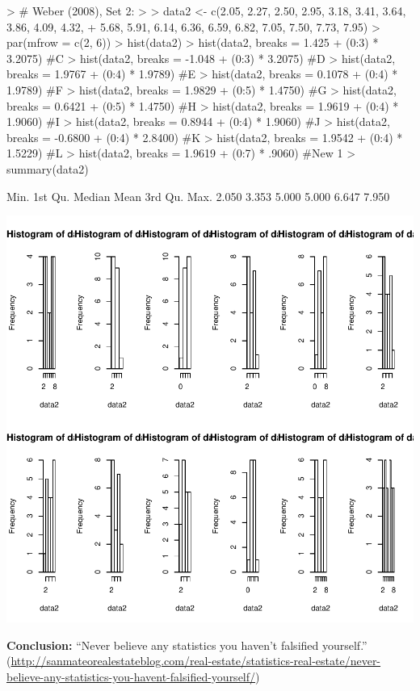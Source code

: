 \documentclass[12pt,letterpaper,final]{article}
\begin{document}
\begin{Schunk}
\begin{Sinput}
> # Weber (2008), Set 2:
> 
> data2 <- c(2.05, 2.27, 2.50, 2.95, 3.18, 3.41, 3.64, 3.86, 4.09, 4.32,
+   5.68, 5.91, 6.14, 6.36, 6.59, 6.82, 7.05, 7.50, 7.73, 7.95)
> par(mfrow = c(2, 6))
> hist(data2)
> hist(data2, breaks = 1.425 + (0:3) * 3.2075) #C
> hist(data2, breaks = -1.048 + (0:3) * 3.2075) #D
> hist(data2, breaks = 1.9767 + (0:4) * 1.9789) #E
> hist(data2, breaks = 0.1078 + (0:4) * 1.9789) #F
> hist(data2, breaks = 1.9829 + (0:5) * 1.4750) #G
> hist(data2, breaks = 0.6421 + (0:5) * 1.4750) #H
> hist(data2, breaks = 1.9619 + (0:4) * 1.9060) #I
> hist(data2, breaks = 0.8944 + (0:4) * 1.9060) #J
> hist(data2, breaks = -0.6800 + (0:4) * 2.8400) #K
> hist(data2, breaks = 1.9542 + (0:4) * 1.5229) #L
> hist(data2, breaks = 1.9619 + (0:7) * .9060) #New 1
> summary(data2)
\end{Sinput}
\begin{Soutput}
   Min. 1st Qu.  Median    Mean 3rd Qu.    Max. 
  2.050   3.353   5.000   5.000   6.647   7.950 
\end{Soutput}
\end{Schunk}
\includegraphics{lect_main-003}

{\bf Conclusion:} ``Never believe any statistics you haven't falsified yourself.'' \\
{\tiny
(\url{http://sanmateorealestateblog.com/real-estate/statistics-real-estate/never-believe-any-statistics-you-havent-falsified-yourself/})
}
\end{document}
